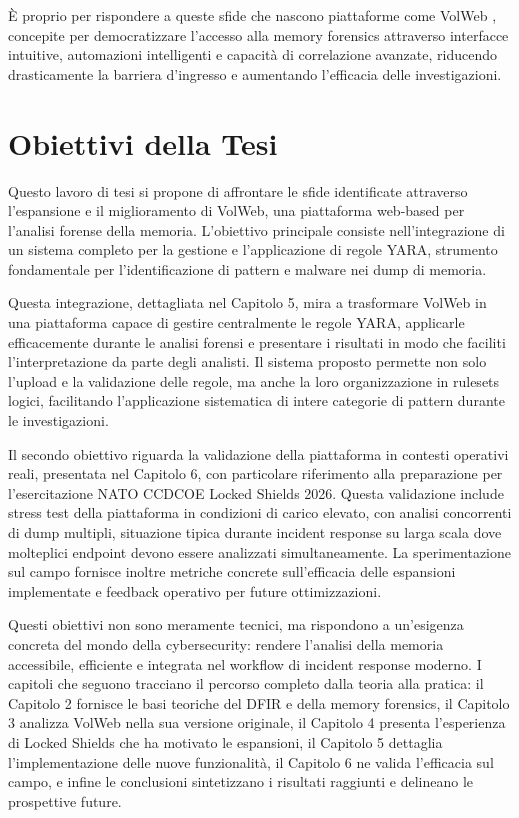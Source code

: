 È proprio per rispondere a queste sfide che nascono piattaforme come VolWeb \cite{volweb2024}, concepite per democratizzare l'accesso alla memory forensics attraverso interfacce intuitive, automazioni intelligenti e capacità di correlazione avanzate, riducendo drasticamente la barriera d'ingresso e aumentando l'efficacia delle investigazioni.

\section{Obiettivi della Tesi}

Questo lavoro di tesi si propone di affrontare le sfide identificate attraverso l'espansione e il miglioramento di VolWeb, una piattaforma web-based per l'analisi forense della memoria. L'obiettivo principale consiste nell'integrazione di un sistema completo per la gestione e l'applicazione di regole YARA, strumento fondamentale per l'identificazione di pattern e malware nei dump di memoria. 

Questa integrazione, dettagliata nel Capitolo 5, mira a trasformare VolWeb in una piattaforma capace di gestire centralmente le regole YARA, applicarle efficacemente durante le analisi forensi e presentare i risultati in modo che faciliti l'interpretazione da parte degli analisti. Il sistema proposto permette non solo l'upload e la validazione delle regole, ma anche la loro organizzazione in rulesets logici, facilitando l'applicazione sistematica di intere categorie di pattern durante le investigazioni.

Il secondo obiettivo riguarda la validazione della piattaforma in contesti operativi reali, presentata nel Capitolo 6, con particolare riferimento alla preparazione per l'esercitazione NATO CCDCOE Locked Shields 2026. Questa validazione include stress test della piattaforma in condizioni di carico elevato, con analisi concorrenti di dump multipli, situazione tipica durante incident response su larga scala dove molteplici endpoint devono essere analizzati simultaneamente. La sperimentazione sul campo fornisce inoltre metriche concrete sull'efficacia delle espansioni implementate e feedback operativo per future ottimizzazioni.

Questi obiettivi non sono meramente tecnici, ma rispondono a un'esigenza concreta del mondo della cybersecurity: rendere l'analisi della memoria accessibile, efficiente e integrata nel workflow di incident response moderno. I capitoli che seguono tracciano il percorso completo dalla teoria alla pratica: il Capitolo 2 fornisce le basi teoriche del DFIR e della memory forensics, il Capitolo 3 analizza VolWeb nella sua versione originale, il Capitolo 4 presenta l'esperienza di Locked Shields che ha motivato le espansioni, il Capitolo 5 dettaglia l'implementazione delle nuove funzionalità, il Capitolo 6 ne valida l'efficacia sul campo, e infine le conclusioni sintetizzano i risultati raggiunti e delineano le prospettive future.